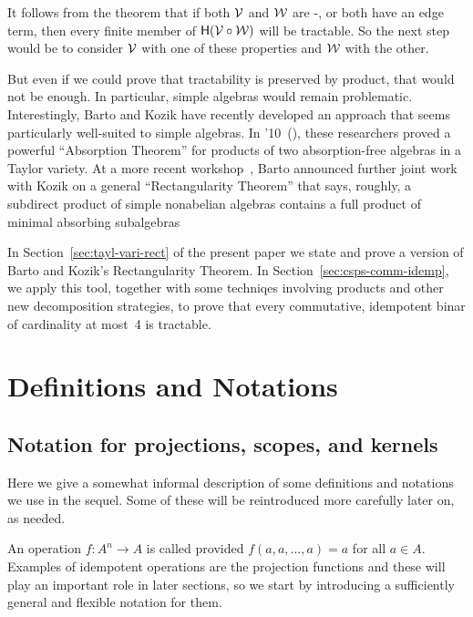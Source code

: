 It follows from the theorem that if both $\mathcal{V}$ and $\mathcal{W}$ are \sd-\meet, or both have an edge term, then every finite member of $\mathsf{H}(\mathcal{V}\circ \mathcal{W})$ will be tractable. So the next step would be to consider $\mathcal{V}$ with one of these properties and $\mathcal{W}$ with the other. 

But even if we could prove that tractability is preserved by \malcev product, that would not be enough. In particular, simple algebras would remain problematic. Interestingly, Barto and Kozik have recently developed an approach that seems particularly well-suited to simple algebras.
In \lics'10~(\cite{MR2953899}), these researchers proved a powerful ``Absorption Theorem'' 
for products of two absorption-free algebras in a Taylor variety.
At a more recent workshop~\cite{Barto-shanks}, Barto announced further joint work with Kozik on 
a general ``Rectangularity Theorem'' 
that says, roughly, a subdirect product of simple nonabelian algebras 
contains a full product of minimal absorbing subalgebras 

In Section~\ref{sec:tayl-vari-rect} of the present paper
we state and prove a version of Barto and Kozik's Rectangularity Theorem. 
In Section~\ref{sec:csps-comm-idemp}, we apply this tool, together with some
techniqes involving \malcev products and other new decomposition strategies,
to prove that every commutative, idempotent binar of cardinality at most~4 is tractable. 

\section{Definitions and Notations}
\subsection{Notation for projections, scopes, and kernels}
\label{sec:proj-scop-kern}
Here we give a somewhat informal description of some definitions and notations
we use in the sequel.  Some of these will be reintroduced more carefully later on, as needed.

An operation $f : A^n \rightarrow A$ is called  provided 
$f(a, a, \dots, a) = a$ for all $a \in A$.
Examples of idempotent operations are the projection functions and these will 
play an important role in later sections, so we start by 
introducing a sufficiently general and flexible notation for them.

